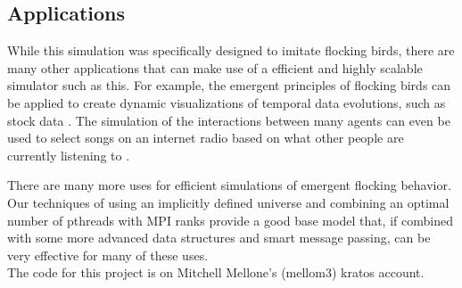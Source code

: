 \subsection*{Applications}
While this simulation was specifically designed to imitate flocking
birds, there are many other applications that can make use of a
efficient and highly scalable simulator such as this. For example, the
emergent principles of flocking birds can be applied to create dynamic
visualizations of temporal data evolutions, such as stock
data \cite{Moere}. The simulation of the interactions between many
agents can even be used to select songs on an internet radio based on
what other people are currently listening to \cite{Ibáñez}.

There are many more uses for efficient simulations of emergent flocking behavior.
Our techniques of using an implicitly defined universe and combining
an optimal number of pthreads with MPI ranks provide a good base model that, if
combined with some more advanced data structures and smart message passing, can
be very effective for many of these uses.
\bigskip\\
The code for this project is on Mitchell Mellone's (mellom3) kratos account.

